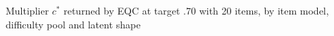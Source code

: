 \begin{table}[ht]
\centering
\caption{Multiplier $c^*$ returned by EQC at target .70 with 20 items, by item model, difficulty pool and latent shape}
\label{tab:app-cstar}
\small

\end{table}
